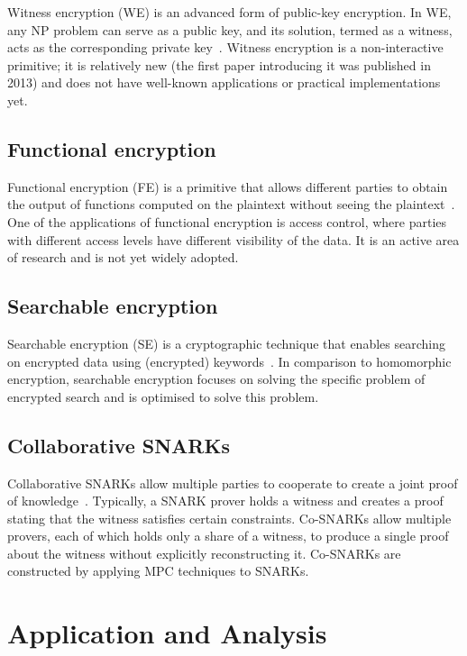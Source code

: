 \documentclass[
    9pt,            %
    report,        %
    affiltop,       %
]{art}
\begin{document}
Witness encryption (WE) is an advanced form of public-key encryption.
In WE, any NP problem can serve as a public key, and its solution, termed as a
witness, acts as the corresponding private key~\citep{we}. Witness encryption
is a non-interactive primitive; it is relatively new (the first paper
introducing it was published in 2013) and does not have well-known applications
or practical implementations yet.

\subsection{Functional encryption}\label{FE}

Functional encryption (FE) is a primitive that allows different parties
to obtain the output of functions computed on the plaintext without seeing the
plaintext~\citep{fe}. One of the applications of functional encryption is access
control, where parties with different access levels have different visibility of
the data. It is an active area of research and is not yet widely adopted.

\subsection{Searchable encryption}\label{SE}

Searchable encryption (SE) is a cryptographic technique that enables searching
on encrypted data using (encrypted) keywords~\citep{se}. In comparison to
homomorphic encryption, searchable encryption focuses on solving the specific
problem of encrypted search and is optimised to solve this problem.


\subsection{Collaborative SNARKs}\label{CoSNARKs}

Collaborative SNARKs allow multiple parties to cooperate to create a joint proof of knowledge~\citep{cosnarks}. Typically, a SNARK prover holds a witness and creates a proof stating that the witness satisfies certain constraints. Co-SNARKs allow multiple provers, each of which holds only a share of a witness, to produce a single proof about the witness without explicitly reconstructing it. Co-SNARKs are constructed by applying MPC techniques to SNARKs.

\section{Application and Analysis}\label{analysis}
\end{document}
